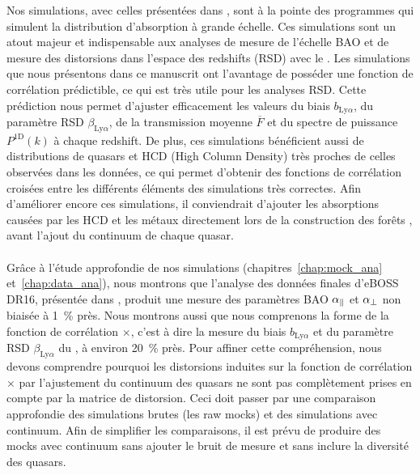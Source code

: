 Nos simulations, avec celles présentées dans \textcite{Farr2019}, sont à la pointe des programmes qui simulent la distribution d'absorption \lya{} à grande échelle. Ces simulations sont un atout majeur et indispensable aux analyses de mesure de l'échelle BAO et de mesure des distorsions dans l'espace des redshifts (RSD) avec le \lya{}. Les simulations que nous présentons dans ce manuscrit ont l'avantage de posséder une fonction de corrélation prédictible, ce qui est très utile pour les analyses RSD.
Cette prédiction nous permet d'ajuster efficacement les valeurs du biais $b_{\mathrm{Ly}\alpha}$, du paramètre RSD $\beta_{\mathrm{Ly}\alpha}$, de la transmission moyenne $\overline F$ et du spectre de puissance $P^{\mathrm{1D}}(k)$ à chaque redshift.
De plus, ces simulations bénéficient aussi de distributions de quasars et HCD (High Column Density) très proches de celles observées dans les données, ce qui permet d'obtenir des fonctions de corrélation croisées entre les différents éléments des simulations très correctes. Afin d'améliorer encore ces simulations, il conviendrait d'ajouter les absorptions causées par les HCD et les métaux directement lors de la construction des forêts \lya{}, avant l'ajout du continuum de chaque quasar.



\paragraph{}
Grâce à l'étude approfondie de nos simulations (chapitres~\ref{chap:mock_ana} et~\ref{chap:data_ana}), nous montrons que l'analyse des données finales d'eBOSS DR16, présentée dans \textcite{DuMasdesBourboux2020}, produit une mesure des paramètres BAO $\alpha_{\parallel}{}$ et $\alpha_{\perp}{}$ non biaisée à \SI{1}{\percent} près.
Nous montrons aussi que nous comprenons la forme de la fonction de corrélation \lya{}$\times$\lya{}, c'est à dire la mesure du biais $b_{\mathrm{Ly}\alpha}$ et du paramètre RSD $\beta_{\mathrm{Ly}\alpha}$ du \lya{}, à environ \SI{20}{\percent} près.
Pour affiner cette compréhension, nous devons comprendre pourquoi les distorsions induites sur la fonction de corrélation \lya{}$\times$\lya{} par l'ajustement du continuum des quasars ne sont pas complètement prises en compte par la matrice de distorsion.
Ceci doit passer par une comparaison approfondie des simulations brutes (les raw mocks) et des simulations avec continuum. Afin de simplifier les comparaisons, il est prévu de produire des mocks avec continuum sans ajouter le bruit de mesure et sans inclure la diversité des quasars.

